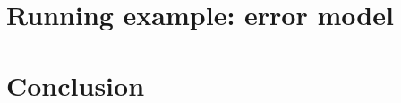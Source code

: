 \documentclass[conference]{IEEEtran}
\begin{document}


    \section{Running example: error model}



    \section{Conclusion}



%

\end{document}
